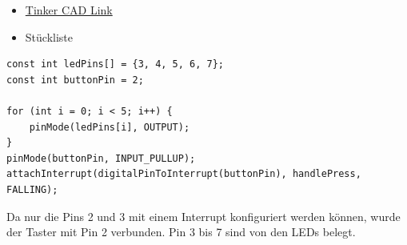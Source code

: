 \begin{itemize}
    \item \href{https://www.tinkercad.com/things/4kQIa2P7zRc-2-reaktionsspiel?sharecode=tN5XWwIVhA9dR5oYUQt6OY9f_J_8c10GSfd3RA9Iedc}{Tinker CAD Link}
    \item Stückliste
\end{itemize}

\begin{verbatim}
const int ledPins[] = {3, 4, 5, 6, 7};
const int buttonPin = 2;

for (int i = 0; i < 5; i++) {
    pinMode(ledPins[i], OUTPUT);
}
pinMode(buttonPin, INPUT_PULLUP);
attachInterrupt(digitalPinToInterrupt(buttonPin), handlePress, FALLING);
\end{verbatim}

Da nur die Pins 2 und 3 mit einem Interrupt konfiguriert werden können, wurde der Taster mit Pin 2 verbunden. Pin 3 bis 7 sind von den LEDs belegt. 
